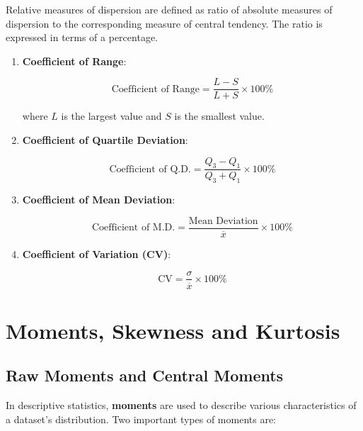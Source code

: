 \documentclass[twoside]{book}
\begin{document}
Relative measures of dispersion are defined as ratio of absolute measures of dispersion to the corresponding measure of central tendency. The ratio is expressed in terms of a percentage.

\begin{enumerate}
    \item \textbf{Coefficient of Range}:
    \begin{textbox}
    \[
    \text{Coefficient of Range} = \frac{L - S}{L + S}\times 100\%
    \]
    \end{textbox}
    where \( L \) is the largest value and \( S \) is the smallest value.

    \item \textbf{Coefficient of Quartile Deviation}:
    \begin{textbox}
    \[
    \text{Coefficient of Q.D.} = \frac{Q_3 - Q_1}{Q_3 + Q_1}\times 100\%
    \]
    \end{textbox}

    \item \textbf{Coefficient of Mean Deviation}:
    \begin{textbox}
    \[
    \text{Coefficient of M.D.} = \frac{\text{Mean Deviation}}{\overline{x}}\times 100\%
    \]
    \end{textbox}

    \item \textbf{Coefficient of Variation (CV)}:
    \begin{textbox}
    \[
    \text{CV} = \frac{\sigma}{\overline{x}} \times 100\%
    \]
    \end{textbox}
\end{enumerate}

\section{Moments, Skewness and Kurtosis}

\subsection{Raw Moments and Central Moments}

In descriptive statistics, \textbf{moments} are used to describe various characteristics of a dataset's distribution. Two important types of moments are:
\end{document}
